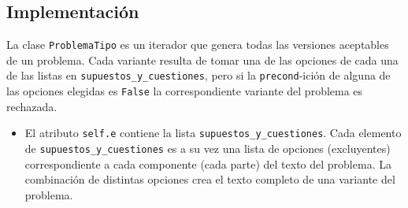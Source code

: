 \documentclass[10pt,a4paper]{report}
\begin{document}
\subsection{Implementación}
\label{sec:org8e077ec}

La clase \texttt{ProblemaTipo} es un iterador que genera todas las versiones aceptables de un problema. 
Cada variante resulta de tomar una de las opciones de cada una de las listas en \texttt{supuestos\_y\_cuestiones}, pero si la \texttt{precond}-ición de alguna de las opciones elegidas es \texttt{False} la correspondiente variante del problema es rechazada.

\begin{itemize}
\item El atributo \texttt{self.e} contiene la lista \texttt{supuestos\_y\_cuestiones}. 
 Cada elemento de \texttt{supuestos\_y\_cuestiones} es a su vez una lista de opciones (excluyentes) correspondiente a cada componente (cada parte) del texto del problema.
La combinación de distintas opciones crea el texto completo de una variante del problema.
\end{itemize}
\end{document}
